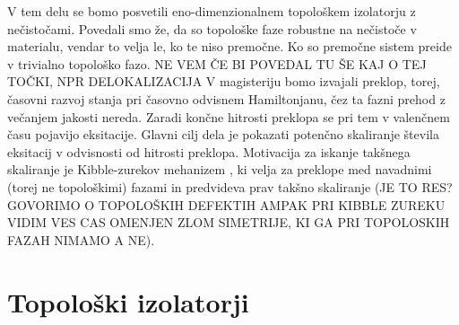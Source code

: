 V tem delu se bomo posvetili eno-dimenzionalnem topološkem izolatorju z nečistočami. Povedali smo že, da so topološke faze robustne na nečistoče v materialu, vendar to velja le, ko te niso premočne. Ko so premočne sistem preide v trivialno topološko fazo. NE VEM ČE BI POVEDAL TU ŠE KAJ O TEJ TOČKI, NPR DELOKALIZACIJA
V magisteriju bomo izvajali preklop, torej, časovni razvoj stanja pri časovno odvisnem Hamiltonjanu, čez ta fazni prehod z večanjem jakosti nereda. Zaradi končne hitrosti preklopa se pri tem v valenčnem času pojavijo eksitacije. Glavni cilj dela je pokazati potenčno skaliranje števila eksitacij v odvisnosti od hitrosti preklopa. Motivacija za iskanje takšnega skaliranje je Kibble-zurekov mehanizem \cite{kibble}, ki velja za preklope med navadnimi (torej ne topološkimi) fazami in predvideva prav takšno skaliranje (JE TO RES? GOVORIMO O TOPOLOŠKIH DEFEKTIH AMPAK PRI KIBBLE ZUREKU VIDIM VES CAS OMENJEN ZLOM SIMETRIJE, KI GA PRI TOPOLOSKIH FAZAH NIMAMO A NE).
\chapter{Topološki izolatorji}
\label{chMa}

